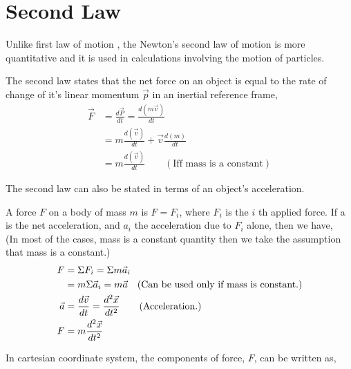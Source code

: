 \section{Second Law}
Unlike first law of motion , the Newton's second law of motion is more quantitative and it is used in calculations involving the motion of particles.
\begin{definition}
	The second law states that the net force on an object is equal to the rate of change  of it's linear momentum $\vec{p}$ in an inertial reference frame,
	\begin{align*}
	\vec{F}&=\frac{d \vec{P}}{d t}=\frac{d(m \vec{v})}{d t}\\
	&=m \frac{d(\vec{v})}{d t}+\vec{v} \frac{d(m)}{d t}\\
	&=m \frac{d(\vec{v})}{d t} \qquad (\text{Iff mass is a constant})
	\end{align*}
	
	The second law can also be stated in terms of an object's acceleration. 
\end{definition}
A force ${F}$ on a body of mass $m$ is ${F}= {F}_{i}$, where ${F}_{i}$ is the $i$ th applied force. If a is the net acceleration, and ${a}_{i}$ the acceleration due to ${F}_{i}$ alone, then we have,\\(In most of the cases, mass is a constant quantity then we take the assumption  that mass is a constant.)
\begin{align}
{F}&=\Sigma {F}_{i}=\Sigma m \vec{a}_{i} \notag\\
&=m {\Sigma}\vec{a}_{i}=m \vec{a} \quad (\text{Can be used only if mass is constant.})\\
\vec{a}&=\frac{d \vec{v}}{d t}=\frac{d^{2} \vec{x}}{d t^{2}}\qquad (\text{Acceleration.}  )\notag\\
{F}&=m \frac{d^{2} \vec{x}}{d t^{2}}\label{newtons1}
\end{align}
\begin{center}
\end{center}
In cartesian coordinate system, the components of force, $F$, can be written as,
\begin{center}
\end{center}\vspace{0.2cm}
